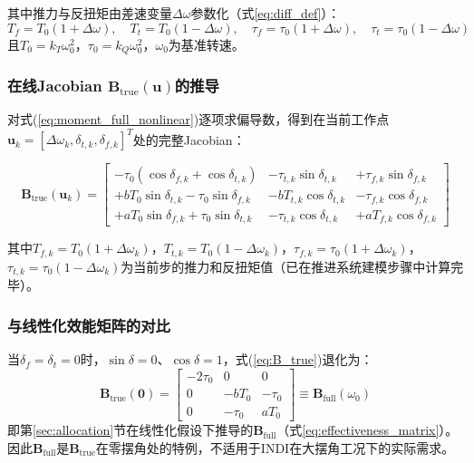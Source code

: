 其中推力与反扭矩由差速变量$\Delta\omega$参数化（式\ref{eq:diff_def}）：
\begin{equation}
    T_f = T_0(1+\Delta\omega), \quad T_t = T_0(1-\Delta\omega), \quad
    \tau_f = \tau_0(1+\Delta\omega), \quad \tau_t = \tau_0(1-\Delta\omega)
    \label{eq:diff_thrust_torque}
\end{equation}
且$T_0=k_T\omega_0^2$，$\tau_0=k_Q\omega_0^2$，$\omega_0$为基准转速。

\subsubsection{在线Jacobian $\mathbf{B}_{\mathrm{true}}(\mathbf{u})$的推导}

对式(\ref{eq:moment_full_nonlinear})逐项求偏导数，得到在当前工作点$\mathbf{u}_k=[\Delta\omega_k,\delta_{t,k},\delta_{f,k}]^T$处的完整Jacobian：

\begin{equation}
    \boxed{
    \mathbf{B}_{\mathrm{true}}(\mathbf{u}_k) =
    \begin{bmatrix}
        -\tau_0(\cos\delta_{f,k}+\cos\delta_{t,k}) & -\tau_{t,k}\sin\delta_{t,k} & +\tau_{f,k}\sin\delta_{f,k} \\[6pt]
        +b T_0\sin\delta_{t,k} - \tau_0\sin\delta_{f,k} & -b T_{t,k}\cos\delta_{t,k} & -\tau_{f,k}\cos\delta_{f,k} \\[6pt]
        +a T_0\sin\delta_{f,k} + \tau_0\sin\delta_{t,k} & -\tau_{t,k}\cos\delta_{t,k} & +a T_{f,k}\cos\delta_{f,k}
    \end{bmatrix}
    }
    \label{eq:B_true}
\end{equation}

其中$T_{f,k}=T_0(1+\Delta\omega_k)$，$T_{t,k}=T_0(1-\Delta\omega_k)$，$\tau_{f,k}=\tau_0(1+\Delta\omega_k)$，$\tau_{t,k}=\tau_0(1-\Delta\omega_k)$为当前步的推力和反扭矩值（已在推进系统建模步骤中计算完毕）。

\subsubsection{与线性化效能矩阵的对比}

当$\delta_f=\delta_t=0$时，$\sin\delta=0$、$\cos\delta=1$，式(\ref{eq:B_true})退化为：
\begin{equation}
    \mathbf{B}_{\mathrm{true}}(\mathbf{0}) =
    \begin{bmatrix}
        -2\tau_0 & 0 & 0 \\
        0 & -b T_0 & -\tau_0 \\
        0 & -\tau_0 & a T_0
    \end{bmatrix}
    \equiv \mathbf{B}_{\mathrm{full}}(\omega_0)
    \label{eq:B_at_zero}
\end{equation}
即第\ref{sec:allocation}节在线性化假设下推导的$\mathbf{B}_{\mathrm{full}}$（式\ref{eq:effectiveness_matrix}）。因此$\mathbf{B}_{\mathrm{full}}$是$\mathbf{B}_{\mathrm{true}}$在零摆角处的特例，不适用于INDI在大摆角工况下的实际需求。

